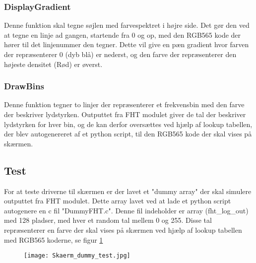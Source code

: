 \subsubsection{DisplayGradient}
Denne funktion skal tegne søjlen med farvespektret i højre side. Det gør den ved at tegne en linje ad gangen, startende fra 0 og op, med den RGB565 kode der hører til det linjenummer den tegner.
Dette vil give en pæn gradient hvor farven der repræsenterer 0 (dyb blå) er nederst, og den farve der repræsenterer den højeste densitet (Rød) er øverst.

\subsubsection{DrawBins}
Denne funktion tegner to linjer der repræsenterer et frekvensbin med den farve der beskriver lydstyrken. Outputtet fra FHT modulet giver de tal der beskriver lydstyrken for hver bin, og de kan derfor oversættes ved hjælp af lookup tabellen, der blev autogenereret af et python script, til den RGB565 kode der skal vises på skærmen.

\subsection{Test}
For at teste driverne til skærmen er der lavet et "dummy array" der skal simulere outputtet fra FHT modulet. Dette array lavet ved at lade et python script autogenere en c fil "DummyFHT.c". Denne fil indeholder er array (fht\_log\_out) med 128 pladser, med hver et random tal mellem 0 og 255. Disse tal repræsenterer en farve der skal vises på skærmen ved hjælp af lookup tabellen med RGB565 koderne, se figur \ref{fig:Skaerm_dummy_test}

\begin{figure} [H]
	\centering
	\texttt{[image: Skaerm\_dummy\_test.jpg]}
	\label{fig:Skaerm_dummy_test}
\end{figure}

%